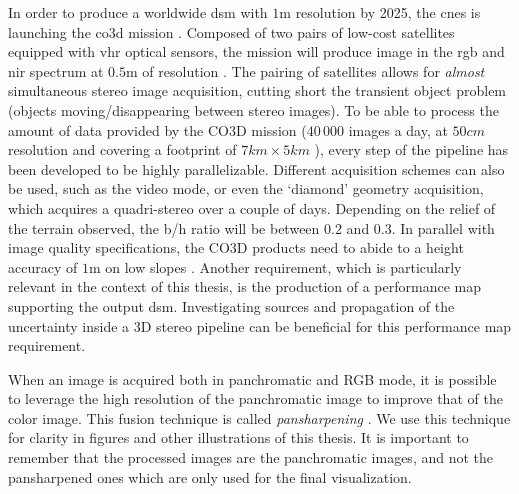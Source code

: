 In order to produce a worldwide \acrshort{dsm} with $1$m resolution by 2025, the \acrfull{cnes} is launching the \acrfull{co3d} mission \cite{melet_co3d_2020}. Composed of two pairs of low-cost satellites equipped with \acrshort{vhr} optical sensors, the mission will produce image in the \acrshort{rgb} and \acrshort{nir} spectrum at $0.5$m of resolution \cite{lebegue_co3d_2020}. The pairing of satellites allows for \textit{almost} simultaneous stereo image acquisition, cutting short the transient object problem (\ie objects moving/disappearing between stereo images). To be able to process the amount of data provided by the CO3D mission ($40\,000$ images a day, at $50cm$ resolution and covering a footprint of $7km\times5km$ \cite{melet_co3d_2020, lebegue_co3d_2020}), every step of the pipeline has been developed to be highly parallelizable. Different acquisition schemes can also be used, such as the video mode, or even the `diamond' geometry acquisition, which acquires a quadri-stereo over a couple of days. Depending on the relief of the terrain observed, the \acrshort{b/h} ratio will be between $0.2$ and $0.3$. In parallel with image quality specifications, the CO3D products need to abide to a height accuracy of $1$m on low slopes . Another requirement, which is particularly relevant in the context of this thesis, is the production of a performance map supporting the output \acrshort{dsm}. Investigating sources and propagation of the uncertainty inside a 3D stereo pipeline can be beneficial for this performance map requirement. 


\begin{remark}
    When an image is acquired both in panchromatic and RGB mode, it is possible to leverage the high resolution of the panchromatic image to improve that of the color image. This fusion technique is called \textit{pansharpening} \cite{loncan_hyperspectral_2015}. We use this technique for clarity in figures and other illustrations of this thesis. It is important to remember that the processed images are the panchromatic images, and not the pansharpened ones which are only used for the final visualization.
\end{remark} 

